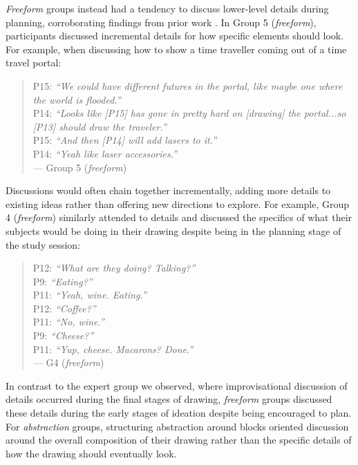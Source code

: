 \textit{Freeform} groups instead had a tendency to discuss lower-level details during planning, corroborating findings from prior work \cite{jansson1991design, Little2010, Yu2016}. In Group 5 (\textit{freeform}), participants discussed incremental details for how specific elements should look. For example, when discussing how to show a time traveller coming out of a time travel portal:

\begin{quote}
    P15: \textit{``We could have different futures in the portal, like maybe one where the world is flooded.''}\\
    P14: \textit{``Looks like [P15] has gone in pretty hard on [drawing] the portal...so [P13] should draw the traveler.''}\\
    P15: \textit{``And then [P14] will add lasers to it.''}\\
    P14: \textit{``Yeah like laser accessories.''}\\
    --- Group 5 (\textit{freeform})
\end{quote}

Discussions would often chain together incrementally, adding more details to existing ideas rather than offering new directions to explore. For example, Group 4 (\textit{freeform}) similarly attended to details and discussed the specifics of what their subjects would be doing in their drawing despite being in the planning stage of the study session:

\begin{quote}
    P12: \textit{``What are they doing? Talking?''}\\
    P9: \textit{``Eating?''}\\
    P11: \textit{``Yeah, wine. Eating.''}\\
    P12: \textit{``Coffee?''}\\
    P11: \textit{``No, wine.''}\\
    P9: \textit{``Cheese?''}\\
    P11: \textit{``Yup, cheese. Macarons? Done.''}\\
    --- G4 (\textit{freeform})
\end{quote}

In contrast to the expert group we observed, where improvisational discussion of details occurred during the final stages of drawing, \textit{freeform} groups discussed these details during the early stages of ideation despite being encouraged to plan. For \textit{abstraction} groups, structuring abstraction around blocks oriented discussion around the overall composition of their drawing rather than the specific details of how the drawing should eventually look.

